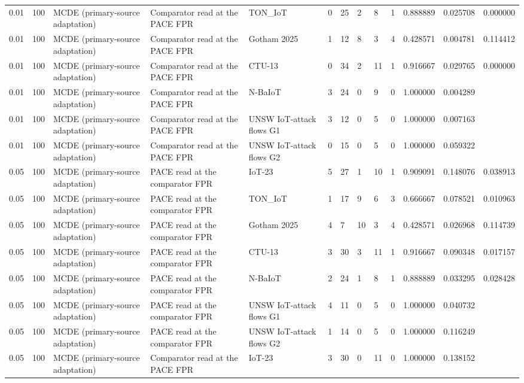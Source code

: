 \begin{tabular}{lllllllllllll}
0.01 & 100 & MCDE (primary-source adaptation) & Comparator read at the PACE FPR & TON\_IoT & 0 & 25 & 2 & 8 & 1 & 0.888889 & 0.025708 & 0.000000 \\
0.01 & 100 & MCDE (primary-source adaptation) & Comparator read at the PACE FPR & Gotham 2025 & 1 & 12 & 8 & 3 & 4 & 0.428571 & 0.004781 & 0.114412 \\
0.01 & 100 & MCDE (primary-source adaptation) & Comparator read at the PACE FPR & CTU-13 & 0 & 34 & 2 & 11 & 1 & 0.916667 & 0.029765 & 0.000000 \\
0.01 & 100 & MCDE (primary-source adaptation) & Comparator read at the PACE FPR & N-BaIoT & 3 & 24 & 0 & 9 & 0 & 1.000000 & 0.004289 &  \\
0.01 & 100 & MCDE (primary-source adaptation) & Comparator read at the PACE FPR & UNSW IoT-attack flows G1 & 3 & 12 & 0 & 5 & 0 & 1.000000 & 0.007163 &  \\
0.01 & 100 & MCDE (primary-source adaptation) & Comparator read at the PACE FPR & UNSW IoT-attack flows G2 & 0 & 15 & 0 & 5 & 0 & 1.000000 & 0.059322 &  \\
0.05 & 100 & MCDE (primary-source adaptation) & PACE read at the comparator FPR & IoT-23 & 5 & 27 & 1 & 10 & 1 & 0.909091 & 0.148076 & 0.038913 \\
0.05 & 100 & MCDE (primary-source adaptation) & PACE read at the comparator FPR & TON\_IoT & 1 & 17 & 9 & 6 & 3 & 0.666667 & 0.078521 & 0.010963 \\
0.05 & 100 & MCDE (primary-source adaptation) & PACE read at the comparator FPR & Gotham 2025 & 4 & 7 & 10 & 3 & 4 & 0.428571 & 0.026968 & 0.114739 \\
0.05 & 100 & MCDE (primary-source adaptation) & PACE read at the comparator FPR & CTU-13 & 3 & 30 & 3 & 11 & 1 & 0.916667 & 0.090348 & 0.017157 \\
0.05 & 100 & MCDE (primary-source adaptation) & PACE read at the comparator FPR & N-BaIoT & 2 & 24 & 1 & 8 & 1 & 0.888889 & 0.033295 & 0.028428 \\
0.05 & 100 & MCDE (primary-source adaptation) & PACE read at the comparator FPR & UNSW IoT-attack flows G1 & 4 & 11 & 0 & 5 & 0 & 1.000000 & 0.040732 &  \\
0.05 & 100 & MCDE (primary-source adaptation) & PACE read at the comparator FPR & UNSW IoT-attack flows G2 & 1 & 14 & 0 & 5 & 0 & 1.000000 & 0.116249 &  \\
0.05 & 100 & MCDE (primary-source adaptation) & Comparator read at the PACE FPR & IoT-23 & 3 & 30 & 0 & 11 & 0 & 1.000000 & 0.138152 &  \\

\end{tabular}
